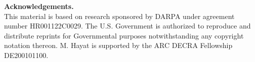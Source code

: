 \documentclass[10pt,twocolumn,letterpaper]{article}
\begin{document}
\noindent \textbf{Acknowledgements.}\\ 
This material is based on research sponsored by DARPA under agreement number HR001122C0029. The U.S. Government is authorized to reproduce and distribute reprints for Governmental purposes notwithstanding any copyright notation thereon. M. Hayat is supported by the ARC DECRA Fellowship DE200101100.

{\small


}
\end{document}
